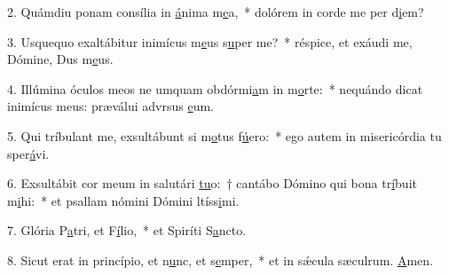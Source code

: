 2. Quámdiu ponam consília in \uline{á}nima m\uline{e}a,~* dolórem in corde me per d\uline{i}em?\par 
3. Usquequo exaltábitur inimícus m\uline{e}us s\uline{u}per me?~* réspice, et exáudi me, Dómine, Dus m\uline{e}us.\par 
4. Illúmina óculos meos ne umquam obdórmi\uline{a}m in m\uline{o}rte:~* nequándo dicat inimícus meus: præválui advrsus \uline{e}um.\par 
5. Qui tríbulant me, exsultábunt si m\uline{o}tus f\uline{ú}ero:~* ego autem in misericórdia tu sper\uline{á}vi.\par 
6. Exsultábit cor meum in salutári \uline{tu}o:~† cantábo Dómino qui bona tr\uline{í}buit m\uline{i}hi:~* et psallam nómini Dómini ltíss\uline{i}mi.\par 
7. Glória P\uline{a}tri, et F\uline{í}lio,~* et Spiríti S\uline{a}ncto.\par 
8. Sicut erat in princípio, et n\uline{u}nc, et s\uline{e}mper,~* et in sǽcula sæculrum. \uline{A}men.\par 
